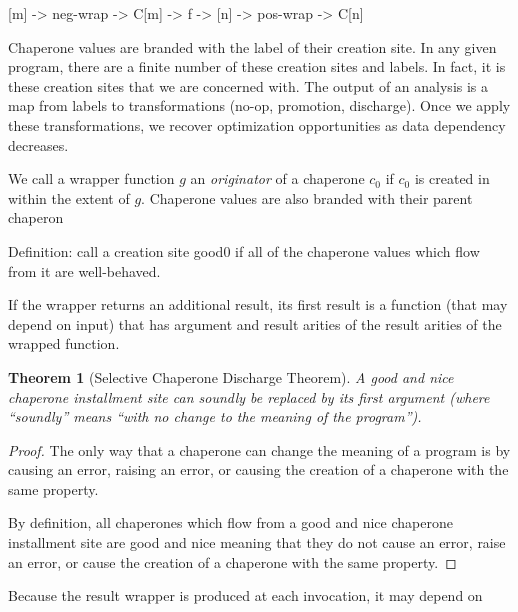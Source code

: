 \documentclass{sigplanconf}
\newtheorem{thm}{Theorem}
\begin{document}

[m] -> neg-wrap -> C[m] -> f -> [n] -> pos-wrap -> C[n]

Chaperone values are branded with the label of their creation site. In any given program, there are a finite number of these creation sites and labels. In fact, it is these creation sites that we are concerned with. The output of an analysis is a map from labels to transformations (no-op, promotion, discharge). Once we apply these transformations, we recover optimization opportunities as data dependency decreases.

We call a wrapper function $g$ an \emph{originator} of a chaperone $c_0$ if $c_0$ is created in within the extent of $g$. Chaperone values are also branded with their parent chaperon

Definition: call a creation site good0 if all of the chaperone values which flow from it are well-behaved.

If the wrapper returns an additional result, its first result is a function (that may depend on input) that has argument and result arities of the result arities of the wrapped function.

\begin{thm}[Selective Chaperone Discharge Theorem]
A good and nice chaperone installment site can soundly be replaced by its first argument (where ``soundly'' means ``with no change to the meaning of the program'').
\end{thm}

\begin{proof}
The only way that a chaperone can change the meaning of a program is by causing an error, raising an error, or causing the creation of a chaperone with the same property.

By definition, all chaperones which flow from a good and nice chaperone installment site are good and nice meaning that they do not cause an error, raise an error, or cause the creation of a chaperone with the same property.
\end{proof}


Because the result wrapper is produced at each invocation, it may depend on 
\end{document}
